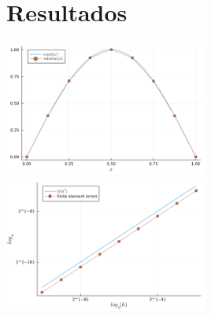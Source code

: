 \documentclass[a4paper]{article}
\begin{document}
\section{Resultados}

\includegraphics[width=0.5\textwidth]{images/solucao_aprox}
\includegraphics[width=0.5\textwidth]{images/convergencia_erro}
\end{document}
